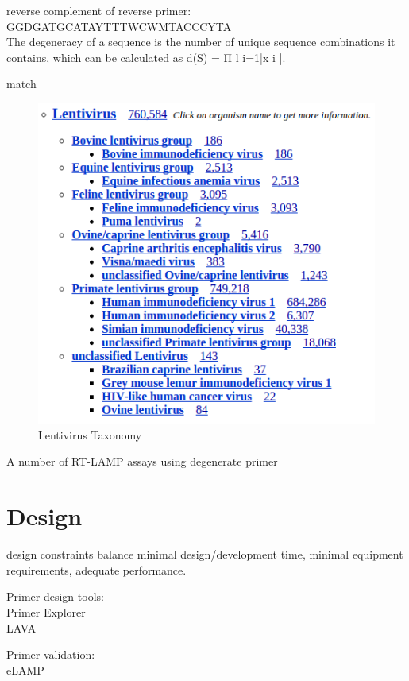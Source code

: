 \documentclass{article}
\begin{document}
reverse complement of reverse primer:\\
GGDGATGCATAYTTTWCWMTACCCYTA\\



The degeneracy of a sequence is the number of unique sequence combinations it contains, which can be calculated as d(S) = Π l i=1|x i |.

match %

\begin{figure}[h!]
\centering
\includegraphics[width=4.5in]{taxonomy_crop.png}
\caption{Lentivirus Taxonomy}
\label{taxonomy}
\end{figure}


A number of RT-LAMP assays using degenerate primer \cite{fukuta2003detection}\cite{nunes2015analysis}

\section{Design}

design constraints balance minimal design/development time, minimal equipment requirements, adequate performance.

Primer design tools:\\
Primer Explorer\\
LAVA\\
\cite{torres2011lava}

Primer validation:\\
eLAMP
\cite{salinas2012electric}
\end{document}
